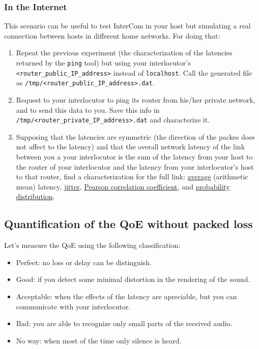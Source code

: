 \subsubsection{In the Internet}

This scenario can be useful to test InterCom in your host but
simulating a real connection between hosts in different home
networks. For doing that:

\begin{enumerate}
  
\item Repeat the previous experiment (the characterization of the
  latencies returned by the \texttt{ping} tool) but using your
  interlocutor's \texttt{<router\_public\_IP\_address>} instead of
  \texttt{localhost}. Call the generated file as
  \texttt{/tmp/<router\_public\_IP\_address>.dat}.
  
\item Request to your interlocutor to ping its router from his/her private
  network, and to send this data to you. Save this info in
  \texttt{/tmp/<router\_private\_IP\_address>.dat} and characterize it.

\item Supposing that the latencies are symmetric (the direction of the
  packes does not affect to the latency) and that the overall network
  latency of the link between you a your interlocutor is the sum of
  the latency from your host to the router of your interlocutor and
  the latency from your interlocutor's host to that router, find a
  characterization for the full link:
  \href{https://en.wikipedia.org/wiki/Average}{average} (arithmetic
  mean) latency, \href{https://en.wikipedia.org/wiki/Jitter}{jitter},
  \href{https://en.wikipedia.org/wiki/Pearson_correlation_coefficient}{Pearson
    correlation coefficient}, and
  \href{https://en.wikipedia.org/wiki/List_of_probability_distributions}{probability
    distribution}.

\end{enumerate}

\subsection{Quantification of the QoE without packed loss}

Let's measure the QoE using the following classification:
\begin{itemize}
\item Perfect: no loss or delay can be distinguish.
\item Good: if you detect some minimal distortion in the rendering
  of the sound.
\item Acceptable: when the effects of the latency are apreciable, but
  you can communicate with your interlocutor.
\item Bad: you are able to recognize only small parts of the
  received audio.
\item No way: when most of the time only silence is heard.
\end{itemize}

